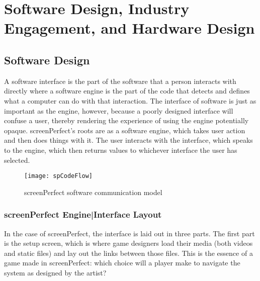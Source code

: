\chapter{Software Design, Industry Engagement, and Hardware Design}\thispagestyle{empty} %
\label{Chapter3} %



\section{Software Design}
A software interface is the part of the software that a person interacts with directly where a software engine is the part of the code that detects and defines what a computer can do with that interaction. 
The interface of software is just as important as the engine, however, because a poorly designed interface will confuse a user, thereby rendering the experience of using the engine potentially opaque. 
screenPerfect's roots are as a software engine, which takes user action and then does things with it. The user interacts with the interface, which speaks to the engine, which then returns values to whichever interface the user has selected.

\newpage
\begin{figure}[h!]
 \centering
 \texttt{[image: spCodeFlow]}
 \caption{screenPerfect software communication model}
\end{figure}
\newpage

\subsection{screenPerfect Engine|Interface Layout}
In the case of screenPerfect, the interface is laid out in three parts. The first part is the setup screen, which is where game designers load their media (both videos and static files) and lay out the links between those files. This is the essence of a game made in screenPerfect: which choice will a player make to navigate the system as designed by the artist?


